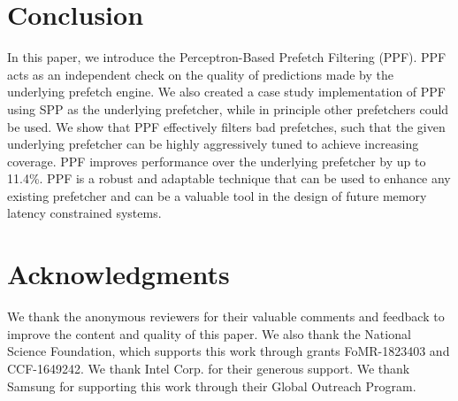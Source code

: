 \section{Conclusion}
\label{Conclusion}
In this paper, we introduce the Perceptron-Based Prefetch Filtering
(PPF).  PPF acts as an independent check on the quality of predictions
made by the underlying prefetch engine.  We also created a case study
implementation of PPF using SPP as the underlying prefetcher, while
in principle other prefetchers could be used.  We show that PPF
effectively filters bad prefetches, such that the given underlying
prefetcher can be highly aggressively tuned to achieve increasing
coverage.  PPF improves performance over the underlying 
prefetcher by up to 11.4\%.  PPF is a robust and adaptable technique 
that can be used to enhance any existing prefetcher and can be a 
valuable tool in the design of future memory latency constrained systems.

\section{Acknowledgments}

We thank the anonymous reviewers for their valuable comments and feedback to
improve the content and quality of this paper.  We also thank the National
Science Foundation, which supports this work through grants FoMR-1823403 and
CCF-1649242.  We thank Intel Corp. for their generous support. We thank
Samsung for supporting this work through their Global Outreach Program.
